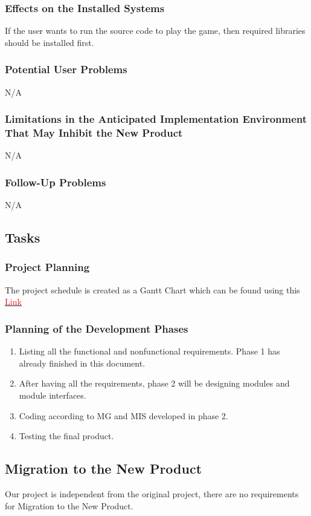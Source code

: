 \documentclass[12pt]{article}
\begin{document}
\subsubsection{Effects on the Installed Systems}
If the user wants to run the source code to play the game, then required 
libraries should be installed first.
\subsubsection{Potential User Problems}
N/A
\subsubsection{Limitations in the Anticipated Implementation Environment That May Inhibit the New Product}
N/A
\subsubsection{Follow-Up Problems}
N/A
\subsection{Tasks}
\subsubsection{Project Planning}
The project schedule is created as a Gantt Chart which can
be found using this \href{https://gitlab.cas.mcmaster.ca/shit19/2022_winter_3xa3_l03_g07/-/tree/main/ProjectSchedule}{\textcolor{red}{Link}}
\subsubsection{Planning of the Development Phases}
\begin{enumerate}[{Phase}1:]
\item Listing all the functional and nonfunctional requirements. Phase 1 has already finished in this document.
\item After having all the requirements, phase 2 will be
designing modules and module interfaces.
\item Coding according to MG and MIS developed in phase 2.
\item Testing the final product.
\end{enumerate}
\subsection{Migration to the New Product}
Our project is independent from the original project, there 
are no requirements for Migration to the New Product.
\end{document}
